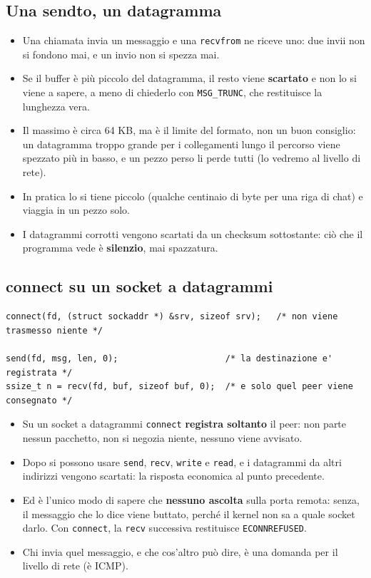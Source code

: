 \subsection{Una sendto, un datagramma}

\begin{itemize}
    \item Una chiamata invia un messaggio e una \texttt{recvfrom} ne riceve uno: due invii non si fondono mai, e un invio
          non si spezza mai.
    \item Se il buffer è più piccolo del datagramma, il resto viene \textbf{scartato} e non lo si viene a sapere, a meno di
          chiederlo con \texttt{MSG\_TRUNC}, che restituisce la lunghezza vera.
    \item Il massimo è circa 64 KB, ma è il limite del formato, non un buon consiglio: un datagramma troppo grande per i
          collegamenti lungo il percorso viene spezzato più in basso, e un pezzo perso li perde tutti (lo vedremo al livello
          di rete).
    \item In pratica lo si tiene piccolo (qualche centinaio di byte per una riga di chat) e viaggia in un pezzo solo.
    \item I datagrammi corrotti vengono scartati da un checksum sottostante: ciò che il programma vede è
          \textbf{silenzio}, mai spazzatura.
\end{itemize}

\subsection{connect su un socket a datagrammi}

\begin{lstlisting}[language={[POSIX]C}, style=wnumbers, title={Un peer registrato}]
connect(fd, (struct sockaddr *) &srv, sizeof srv);   /* non viene trasmesso niente */

send(fd, msg, len, 0);                     /* la destinazione e' registrata */
ssize_t n = recv(fd, buf, sizeof buf, 0);  /* e solo quel peer viene consegnato */
\end{lstlisting}

\begin{itemize}
    \item Su un socket a datagrammi \texttt{connect} \textbf{registra soltanto} il peer: non parte nessun pacchetto, non si
          negozia niente, nessuno viene avvisato.
    \item Dopo si possono usare \texttt{send}, \texttt{recv}, \texttt{write} e \texttt{read}, e i datagrammi da altri
          indirizzi vengono scartati: la risposta economica al punto precedente.
    \item Ed è l'unico modo di sapere che \textbf{nessuno ascolta} sulla porta remota: senza, il messaggio che lo dice
          viene buttato, perché il kernel non sa a quale socket darlo. Con \texttt{connect}, la \texttt{recv} successiva
          restituisce \texttt{ECONNREFUSED}.
    \item Chi invia quel messaggio, e che cos'altro può dire, è una domanda per il livello di rete (è ICMP).
\end{itemize}

